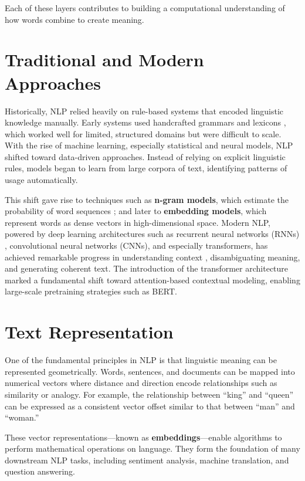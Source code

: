 \documentclass[a4paper,12pt]{report}
\begin{document}
Each of these layers contributes to building a computational understanding of how words combine to create meaning.

\section{Traditional and Modern Approaches}
Historically, NLP relied heavily on rule-based systems that encoded linguistic knowledge manually. 
Early systems used handcrafted grammars and lexicons \cite{MANNING1999}, which worked well for limited, structured domains but were difficult to scale. 
With the rise of machine learning, especially statistical and neural models, NLP shifted toward data-driven approaches. 
Instead of relying on explicit linguistic rules, models began to learn from large corpora of text, identifying patterns of usage automatically.

This shift gave rise to techniques such as \textbf{n-gram models}, which estimate the probability of word sequences \cite{BROWN1992}; and later to \textbf{embedding models}, which represent words as dense vectors in high-dimensional space. 
Modern NLP, powered by deep learning architectures \cite{LECUN2015} such as recurrent neural networks (RNNs) \cite{RUMELHART1986} \cite{HOCHREITER1997}, convolutional neural networks (CNNs), and especially transformers, has achieved remarkable progress in understanding context \cite{GOODFELLOW2016}, disambiguating meaning, and generating coherent text.
The introduction of the transformer architecture \cite{VASWANI2017Attention} marked a fundamental shift toward attention-based contextual modeling, enabling large-scale pretraining strategies such as BERT.

\section{Text Representation}
One of the fundamental principles in NLP is that linguistic meaning can be represented geometrically. 
Words, sentences, and documents can be mapped into numerical vectors where distance and direction encode relationships such as similarity or analogy. \cite{CHURCH1990}
For example, the relationship between “king” and “queen” can be expressed as a consistent vector offset similar to that between “man” and “woman.”  

These vector representations—known as \textbf{embeddings}—enable algorithms to perform mathematical operations on language. \cite{BENGIO2003} 
They form the foundation of many downstream NLP tasks, including sentiment analysis, machine translation, and question answering.
\end{document}
